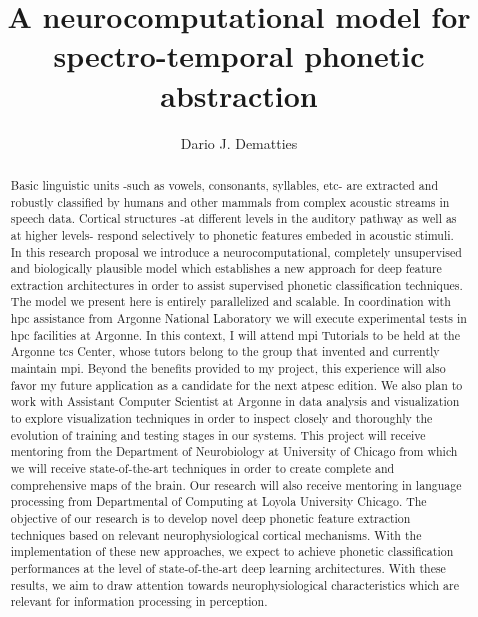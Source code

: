 \documentclass[11pt,a4paper]{article}
\title{A neurocomputational model for spectro-temporal phonetic abstraction}
\author[1]{Dario J. Dematties}
\affil[1]{Instituto de Ingeniería Biomédica, Facultad de Ingeniería, Universidad de Buenos Aires,
Ciudad Autonoma de Buenos Aires, Buenos Aires, Argentina}
\begin{document}
\linenumbers


\maketitle

\begin{abstract}
Basic linguistic units -such as vowels, consonants, syllables, etc-
are extracted and robustly classified by humans and other mammals
from complex acoustic streams in speech data.
Cortical structures -at different levels in the auditory pathway as well as at higher levels-
respond selectively to phonetic features embeded in acoustic stimuli.
In this research proposal we introduce a neurocomputational,
completely unsupervised and biologically plausible model
which establishes a new approach for deep feature extraction
architectures in order to assist supervised phonetic classification
techniques.
The model we present here is entirely parallelized and scalable.
In coordination with \gls{hpc} assistance from Argonne National Laboratory
we will execute experimental tests in \gls{hpc} facilities at Argonne.
In this context, I will attend \gls{mpi} Tutorials to be held at
the Argonne \gls{tcs} Center, whose tutors belong to the group
that invented and currently maintain \gls{mpi}.
Beyond the benefits provided to my project,
this experience will also favor my future application as a candidate
for the next \gls{atpesc} edition. 
We also plan to work with Assistant Computer Scientist at Argonne
in data analysis and visualization to explore visualization techniques
in order to inspect closely and thoroughly the evolution of
training and testing stages
in our systems.
This project will receive mentoring from the Department of Neurobiology at
University of Chicago from which we will receive state-of-the-art
techniques in order to create complete and comprehensive maps of the brain.
Our research will also receive mentoring in language processing
from Departmental of Computing at
Loyola University Chicago.
The objective of our research is to develop novel deep phonetic
feature extraction techniques based on relevant neurophysiological
cortical mechanisms.
With the implementation of these new approaches, we expect to
achieve phonetic classification performances at the level of state-of-the-art deep learning architectures. 
With these results, we aim to draw attention 
towards neurophysiological characteristics which are
relevant for information processing in perception.
\end{abstract}
\end{document}
